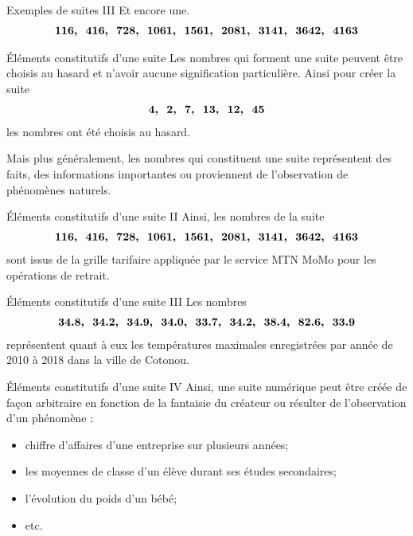 \documentclass{beamer}
\begin{document}
\begin{frame}{Exemples de suites III}
  Et encore une.
  \begin{align*}
    \footnotesize
    \bm{116,\ \ 416,\ \ 728,\ \ 1061,\ \ 1561,\ \ 2081,\ \ 3141,\ \ 3642,\ \ 4163}
  \end{align*}
\end{frame}

\begin{frame}{\'{E}léments constitutifs d'une suite}
  Les nombres qui forment une suite peuvent être choisis au hasard et n'avoir aucune signification particulière. Ainsi pour créer la suite
  \begin{align*}
    \footnotesize
    \bm{4,\ \ 2,\ \ 7,\ \ 13,\ \ 12,\ \ 45}
  \end{align*}
  les nombres ont été choisis au hasard.

  Mais plus généralement, les nombres qui constituent une suite représentent des faits, des informations importantes ou proviennent de l'observation de phénomènes naturels.
\end{frame}

\begin{frame}{\'{E}léments constitutifs d'une suite II}  
  Ainsi, les nombres de la suite
  \begin{align*}
    \footnotesize
    \bm{116,\ \ 416,\ \ 728,\ \ 1061,\ \ 1561,\ \ 2081,\ \ 3141,\ \ 3642,\ \ 4163}
  \end{align*}
  sont issus de la grille tarifaire appliquée par le service MTN MoMo pour les opérations de retrait.
\end{frame}

\begin{frame}{\'{E}léments constitutifs d'une suite III}  
  Les nombres
  \begin{align*}
    \footnotesize
    \bm{34.8,\ \ 34.2,\ \ 34.9,\ \ 34.0,\ \ 33.7,\ \ 34.2,\ \ 38.4,\ \ 82.6,\ \ 33.9}
  \end{align*}
  représentent quant à eux les températures maximales enregistrées par année de 2010 à 2018 dans la ville de Cotonou. 
\end{frame}

\begin{frame}{\'{E}léments constitutifs d'une suite IV}
  Ainsi, une suite numérique peut être créée de façon arbitraire en fonction de la fantaisie du créateur ou résulter de l'observation d'un phénomène :
  \begin{itemize}
    \item chiffre d'affaires d'une entreprise sur plusieurs années;
    \item les moyennes de classe d'un élève durant ses études secondaires;
    \item l'évolution du poids d'un bébé;
    \item etc.
  \end{itemize}
\end{frame}
\end{document}
